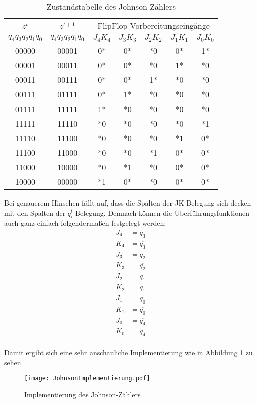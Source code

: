\begin{table}[htp]
\centering
\begin{tabular}{cc|*{5}{c}}
$z^t$ & $z^{t+1}$ & \multicolumn{5}{|c}{FlipFlop-Vorbereitungseingänge}\\
$q_4 q_3 q_2 q_1 q_0$ & $q_4 q_3 q_2 q_1 q_0$ & $J_4 K_4$ & $J_3 K_3$ & $J_2 K_2$ & $J_1 K_1$ & $J_0 K_0$\\ \hline
00000 & 00001 & 0* & 0* & *0 & 0* & 1*\\
00001 & 00011 & 0* & 0* & *0 & 1* & *0\\
00011 & 00111 & 0* & 0* & 1* & *0 & *0\\
00111 & 01111 & 0* & 1* & *0 & *0 & *0\\
01111 & 11111 & 1* & *0 & *0 & *0 & *0\\
11111 & 11110 & *0 & *0 & *0 & *0 & *1\\
11110 & 11100 & *0 & *0 & *0 & *1 & 0*\\
11100 & 11000 & *0 & *0 & *1 & 0* & 0*\\
11000 & 10000 & *0 & *1 & *0 & 0* & 0*\\
10000 & 00000 & *1 & 0* & *0 & 0* & 0*\\
\end{tabular}
\caption{Zustandstabelle des Johnson-Zählers}
\label{JohnTab}
\end{table}

Bei genauerem Hinsehen fällt auf, dass die Spalten der JK-Belegung sich decken mit den Spalten der $q_i^t$ Belegung. Demnach können die Überführungsfunktionen auch ganz einfach folgendermaßen festgelegt werden:
\begin{align*}
	J_4 &= q_3 \\
	K_4 &= \overline{q_3} \\
	J_3 &= q_2 \\
	K_3 &= \overline{q_2} \\
	J_2 &= q_1 \\
	K_2 &= \overline{q_1} \\
	J_1 &= q_0 \\
	K_1 &= \overline{q_0} \\
	J_0 &= \overline{q_4} \\
	K_0 &= q_4 \\
\end{align*}

Damit ergibt sich eine sehr anschauliche Implementierung wie in Abbildung \ref{JohnImpl} zu sehen.
\begin{figure}[htp]
	\centering
	\texttt{[image: JohnsonImplementierung.pdf]} 
	\caption{Implementierung des Johnson-Zählers}
	\label{JohnImpl}
\end{figure}

